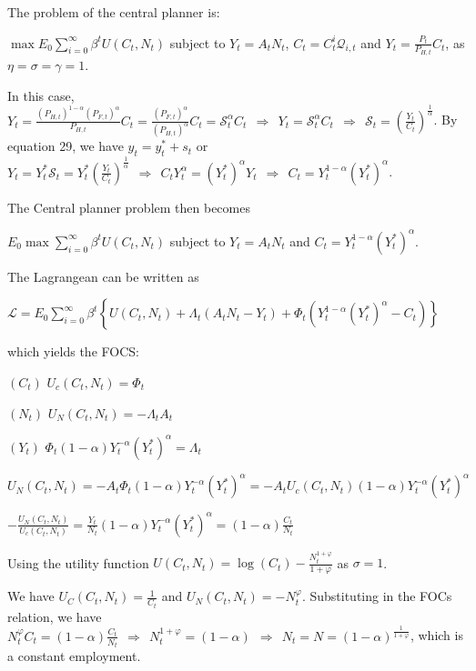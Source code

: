 \documentclass[
]{article}
\begin{document}
The problem of the central planner is:

\(\displaystyle \max E_0\sum_{i=0}^\infty \beta^t U(C_t,N_t)\) subject
to \(Y_t=A_tN_t\), \(\displaystyle C_t=C_t^i\mathcal{Q}_{i,t}\) and
\(\displaystyle Y_t=\frac{P_t}{P_{H,t}} C_t\), as
\(\eta=\sigma=\gamma=1\).

In this case,
\(\displaystyle Y_t=\frac{(P_{H,t})^{1-\alpha}(P_{F,t})^{\alpha}}{P_{H,t}} C_t = \frac{(P_{F,t})^{\alpha}}{(P_{H,t})^{\alpha}}C_t=\mathcal{S}_t^{\alpha}C_t \ \ \Rightarrow \ \ Y_t=\mathcal{S}_t^{\alpha}C_t \ \ \Rightarrow \ \ \mathcal{S}_t= \left( \frac{Y_t}{C_t} \right)^{\frac{1}{\alpha}}\).
By equation 29, we have \(y_t=y_t^*+s_t\) or
\(\displaystyle Y_t=Y_t^{*} \mathcal{S}_t= Y_t^{*} \left( \frac{Y_t}{C_t} \right)^{\frac{1}{\alpha}} \ \ \Rightarrow \ \ C_t Y_t^\alpha = (Y_t^*)^\alpha Y_t \ \ \Rightarrow \ \ C_t=Y_t^{1-\alpha}(Y_t^*)^\alpha\).

The Central planner problem then becomes

\(\displaystyle E_0\max \sum_{i=0}^\infty \beta^t U(C_t,N_t)\) subject
to \(Y_t=A_tN_t\) and \(C_t=Y_t^{1-\alpha}(Y_t^*)^\alpha\).

The Lagrangean can be written as

\(\displaystyle \mathcal{L}= E_0 \sum_{i=0}^\infty \beta^t \left\{ U(C_t,N_t) +\Lambda_t(A_t N_t - Y_t) + \Phi_t \left( Y_t^{1-\alpha}(Y_t^*)^\alpha -C_t \right) \right\}\)

which yields the FOCS:

\((C_t)\) \(U_c(C_t,N_t)=\Phi_t\)

\((N_t)\) \(U_N(C_t,N_t)=-\Lambda_t A_t\)

\((Y_t)\) \(\Phi_t (1-\alpha)Y_t^{-\alpha}(Y_t^*)^\alpha =\Lambda_t\)

\(U_N(C_t,N_t) = -A_t \Phi_t (1-\alpha)Y_t^{-\alpha}(Y_t^*)^\alpha = -A_t U_c(C_t,N_t) (1-\alpha)Y_t^{-\alpha}(Y_t^*)^\alpha\)

\(\displaystyle -\frac{U_N(C_t,N_t)}{U_c(C_t,N_t)} = \frac{Y_t}{N_t} (1-\alpha)Y_t^{-\alpha}(Y_t^*)^\alpha=(1-\alpha) \frac{C_t}{N_t}\)

Using the utility function
\(\displaystyle U(C_t,N_t)=\log(C_t)-\frac{N_t^{1+\varphi}}{1+\varphi}\)
as \(\sigma=1\).

We have \(\displaystyle U_C(C_t,N_t)=\frac{1}{C_t}\) and
\(\displaystyle U_N(C_t,N_t)=-N_t^\varphi\). Substituting in the FOCs
relation, we have
\(\displaystyle N_t^\varphi C_t=(1-\alpha)\frac{C_t}{N_t} \ \ \Rightarrow \ \ N_t^{1+\varphi}=(1-\alpha) \ \ \Rightarrow \ \ N_t = N = (1-\alpha)^{\frac{1}{1+\varphi}}\),
which is a constant employment.
\end{document}
